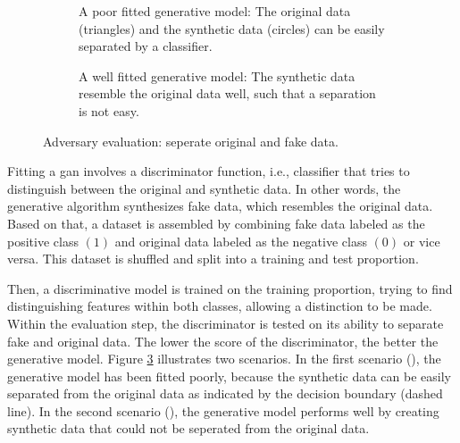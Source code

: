 \documentclass[../../main.tex]{subfiles}
\begin{document}
 \begin{figure}[t!]%
    \centering%
    \begin{subfigure}[b]{0.49\textwidth}%
        \centering\captionsetup{width=.8\linewidth}%
        \caption{A poor fitted generative model: The original data (triangles) and the synthetic data (circles) can be easily separated by a classifier.}%
        \label{subfig:adversary_evaluation_bad}%
    \end{subfigure}%
    \hfill%
    \begin{subfigure}[b]{0.49\textwidth}%
        \centering\captionsetup{width=.8\linewidth}%
        \caption{A well fitted generative model: The synthetic data resemble the original data well, such that a separation is not easy.}%
        \label{subfig:adversary_evaluation_good}%
    \end{subfigure}%
    \caption[Adversary evaluation]{Adversary evaluation: seperate original and fake data.}%
    \label{fig:adversary_evaluation}%
\end{figure}%

Fitting a \gls{gan} involves a discriminator function, i.e., classifier that tries to distinguish between the original and synthetic data. In other words, the generative algorithm synthesizes fake data, which resembles the original data. Based on that, a dataset is assembled by combining fake data labeled as the positive class $(1)$ and original data labeled as the negative class $(0)$ or vice versa. This dataset is shuffled and split into a training and test proportion.

Then, a discriminative model is trained on the training proportion, trying to find distinguishing features within both classes, allowing a distinction to be made. Within the evaluation step, the discriminator is tested on its ability to separate fake and original data. The lower the score of the discriminator, the better the generative model. Figure \ref{fig:adversary_evaluation} illustrates two scenarios. In the first scenario (), the generative model has been fitted poorly, because the synthetic data can be easily separated from the original data as indicated by the decision boundary (dashed line). In the second scenario (), the generative model performs well by creating synthetic data that could not be seperated from the original data. 
\end{document}
